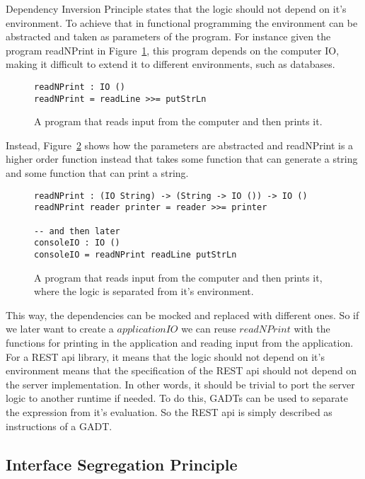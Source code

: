 Dependency Inversion Principle states that the logic should not depend on it's
environment. To achieve that in functional programming the environment can
be abstracted and taken as parameters of the program. For instance given the
program readNPrint in Figure~\ref{diexample}, this program depends on the
computer IO, making it difficult to extend it to different environments, such as
databases. 

\begin{figure}[H]
    \begin{lstlisting}
readNPrint : IO () 
readNPrint = readLine >>= putStrLn
    \end{lstlisting}
    \caption{A program that reads input from the computer and then prints it.}
    \label{diexample}
\end{figure}

Instead, Figure~\ref{withdiexample} shows how the parameters are abstracted and
readNPrint is a higher order function instead that takes some function that
can generate a string and some function that can print a string.


\begin{figure}[H]
    \begin{lstlisting}
readNPrint : (IO String) -> (String -> IO ()) -> IO ()
readNPrint reader printer = reader >>= printer

-- and then later
consoleIO : IO ()
consoleIO = readNPrint readLine putStrLn
    \end{lstlisting}
    \caption{A program that reads input from the computer and then prints it,
    where the logic is separated from it's environment.}
    \label{withdiexample}
\end{figure}

This way, the dependencies can be mocked and replaced with different ones. So if
we later want to create a $applicationIO$ we can reuse $readNPrint$ with the
functions for printing in the application and reading input from the
application.  For a REST api library, it means that the logic should not depend
on it's environment means that the specification of the REST api should not
depend on the server implementation. In other words, it should be trivial to
port the server logic to another runtime if needed. To do this, GADTs can be
used to separate the expression from it's evaluation. So the REST api is simply
described as instructions of a GADT. 

\subsection{Interface Segregation Principle} 


